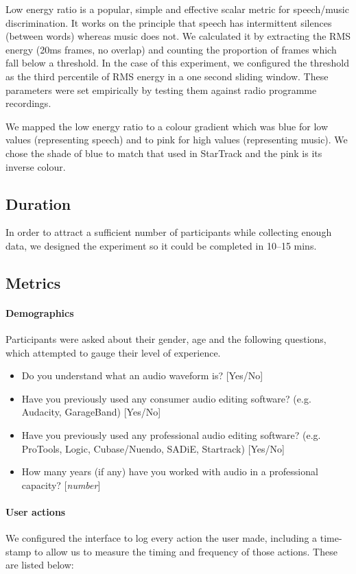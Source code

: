 Low energy ratio is a popular, simple and effective scalar metric for
speech/music discrimination. It works on the principle that speech has intermittent silences (between words) whereas
music does not. We calculated it by extracting the RMS energy (20ms frames, no overlap) and counting the proportion of
frames which fall below a threshold.  In the case of this experiment, we configured the threshold as the third
percentile of RMS energy in a one second sliding window. These parameters were set empirically by testing them against
radio programme recordings.

We mapped the low energy ratio to a colour gradient which was blue for low values (representing speech) and to pink
for high values (representing music). We chose the shade of blue to match that used in StarTrack and the pink is
its inverse colour.

\subsection{Duration}
In order to attract a sufficient number of participants while collecting enough data, we designed the experiment so it
could be completed in 10--15 mins.

\subsection{Metrics}\label{sec:metrics}
\paragraph{Demographics}
Participants were asked about their gender, age and the following questions, which attempted to gauge their level of
experience.

{\singlespacing
\begin{itemize}
  \item Do you understand what an audio waveform is? [Yes/No]
  \item Have you previously used any consumer audio editing software? (e.g.
    Audacity, GarageBand) [Yes/No]
  \item Have you previously used any professional audio editing software? (e.g.
    ProTools, Logic, Cubase/Nuendo, SADiE, Startrack) [Yes/No]
  \item How many years (if any) have you worked with audio in a professional
    capacity? [\textit{number}]
\end{itemize}
}

\paragraph{User actions}
We configured the interface to log every action the user made, including a time-stamp to allow us to measure the timing
and frequency of those actions. These are listed below:

